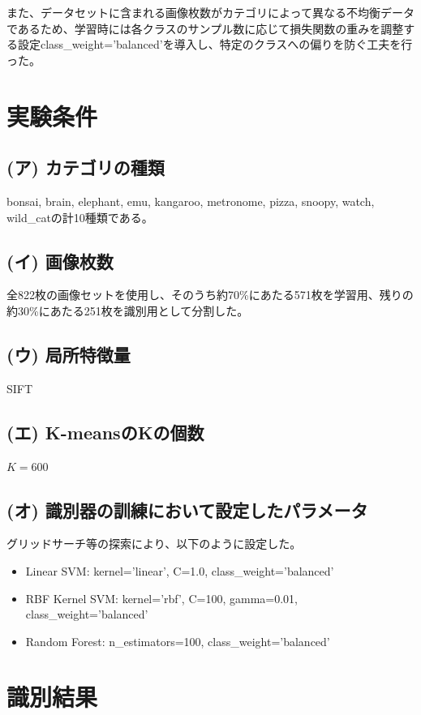\documentclass[a4paper,11pt]{jsarticle}
\begin{document}
また、データセットに含まれる画像枚数がカテゴリによって異なる不均衡データであるため、学習時には各クラスのサンプル数に応じて損失関数の重みを調整する設定class\_weight='balanced'を導入し、特定のクラスへの偏りを防ぐ工夫を行った。

\section{実験条件}

\subsection*{(ア) カテゴリの種類}
bonsai, brain, elephant, emu, kangaroo, metronome, pizza, snoopy, watch, wild\_catの計10種類である。

\subsection*{(イ) 画像枚数}
全822枚の画像セットを使用し、そのうち約70\%にあたる571枚を学習用、残りの約30\%にあたる251枚を識別用として分割した。

\subsection*{(ウ) 局所特徴量}
SIFT

\subsection*{(エ) K-meansのKの個数}
$K=600$

\subsection*{(オ) 識別器の訓練において設定したパラメータ}
グリッドサーチ等の探索により、以下のように設定した。
\begin{itemize}
    \item Linear SVM: kernel='linear', C=1.0, class\_weight='balanced'
    \item RBF Kernel SVM: kernel='rbf', C=100, gamma=0.01, class\_weight='balanced'
    \item Random Forest: n\_estimators=100, class\_weight='balanced'
\end{itemize}

\section{識別結果}
\end{document}
